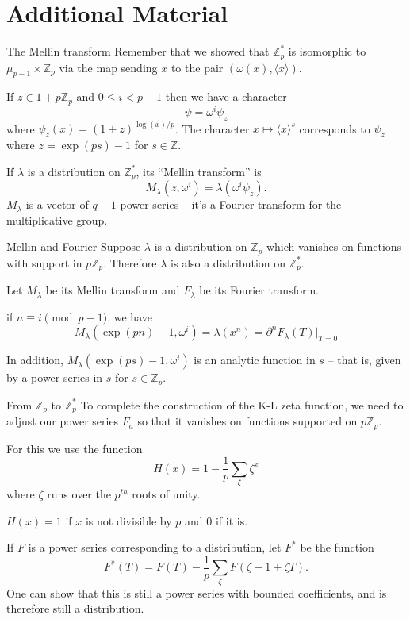 \documentclass[
  ignorenonframetext,
]{beamer}
\begin{document}
\hypertarget{additional-material}{%
\section{Additional Material}\label{additional-material}}

\begin{frame}{The Mellin transform}
\protect\hypertarget{the-mellin-transform}{}
Remember that we showed that \(\mathbb{Z}_p^{*}\) is isomorphic to
\(\mu_{p-1}\times\mathbb{Z}_p\) via the map sending \(x\) to the pair
\((\omega(x),\langle x\rangle)\).

If \(z\in 1+p\mathbb{Z}_p\) and \(0\le i<p-1\) then we have a character
\[
\psi = \omega^{i}\psi_z
\] where \(\psi_z(x) = (1+z)^{\log(x)/p}\). The character
\(x\mapsto \langle x\rangle^{s}\) corresponds to \(\psi_z\) where
\(z=\exp(ps)-1\) for \(s\in\mathbb{Z}\).

If \(\lambda\) is a distribution on \(\mathbb{Z}_p^{*}\), its ``Mellin
transform'' is \[
M_{\lambda}(z,\omega^i)=\lambda(\omega^i\psi_z).
\] \(M_{\lambda}\) is a vector of \(q-1\) power series -- it's a Fourier
transform for the multiplicative group.
\end{frame}

\begin{frame}{Mellin and Fourier}
\protect\hypertarget{mellin-and-fourier}{}
Suppose \(\lambda\) is a distribution on \(\mathbb{Z}_p\) which vanishes
on functions with support in \(p\mathbb{Z}_p\). Therefore \(\lambda\) is
also a distribution on \(\mathbb{Z}_p^{*}\).

Let \(M_{\lambda}\) be its Mellin transform and \(F_{\lambda}\) be its
Fourier transform.

if \(n\equiv i\pmod{p-1}\), we have \[
M_{\lambda}(\exp(pn)-1,\omega^{i})=\lambda(x^n)=\partial^{n}F_{\lambda}(T)|_{T=0}
\]

In addition, \(M_{\lambda}(\exp(ps)-1,\omega^{i})\) is an analytic
function in \(s\) -- that is, given by a power series in \(s\) for
\(s\in\mathbb{Z}_p\).
\end{frame}

\begin{frame}{From \(\mathbb{Z}_p\) to \(\mathbb{Z}_p^{*}\)}
\protect\hypertarget{from-mathbbz_p-to-mathbbz_p}{}
To complete the construction of the K-L zeta function, we need to adjust
our power series \(F_a\) so that it vanishes on functions supported on
\(p\mathbb{Z}_p\).

For this we use the function \[
H(x) = 1-\frac{1}{p}\sum_{\zeta} \zeta^x
\] where \(\zeta\) runs over the \(p^{th}\) roots of unity.

\(H(x)=1\) if \(x\) is not divisible by \(p\) and \(0\) if it is.

If \(F\) is a power series corresponding to a distribution, let
\(F^{*}\) be the function \[
F^{*}(T) = F(T)-\frac{1}{p}\sum_{\zeta}F(\zeta-1+\zeta T).  
\] One can show that this is still a power series with bounded
coefficients, and is therefore still a distribution.
\end{frame}
\end{document}
